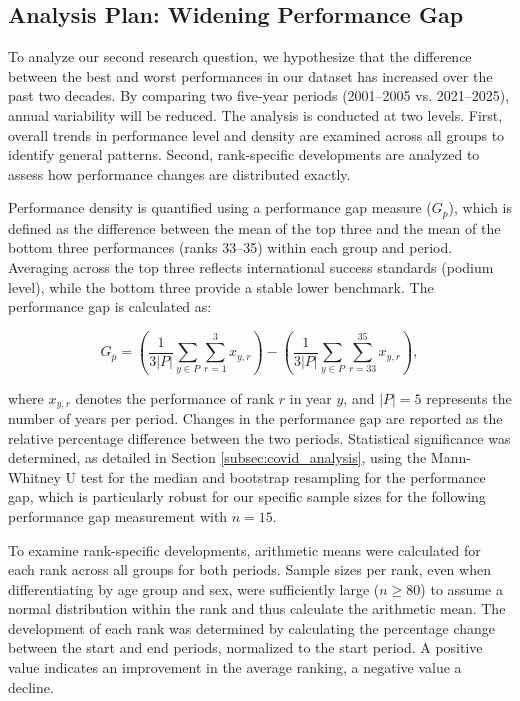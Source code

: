 \subsection{Analysis Plan: Widening Performance Gap}
To analyze our second research question, we hypothesize that the difference between the best and worst performances in our dataset has increased over the past two decades. By comparing two five-year periods (2001–2005 vs. 2021–2025), annual variability will be reduced. The analysis is conducted at two levels. First, overall trends in performance level and density are examined across all groups to identify general patterns. Second, rank-specific developments are analyzed to assess how performance changes are distributed exactly.

Performance density is quantified using a performance gap measure ($G_p$), which is defined as the difference between the mean of the top three and the mean of the bottom three performances (ranks 33–35) within each group and period. Averaging across the top three reflects international success standards (podium level), while the bottom three provide a stable lower benchmark. The performance gap is calculated as:

\begin{equation}
G_p = \left( \frac{1}{3|P|} \sum_{y \in P} \sum_{r=1}^{3} x_{y,r} \right) - \left( \frac{1}{3|P|} \sum_{y \in P} \sum_{r=33}^{35} x_{y,r} \right),
\end{equation}

where $x_{y,r}$ denotes the performance of rank $r$ in year $y$, and $|P| = 5$ represents the number of years per period. Changes in the performance gap are reported as the relative percentage difference between the two periods. Statistical significance was determined, as detailed in Section \ref{subsec:covid_analysis}, using the Mann-Whitney U test for the median and bootstrap resampling for the performance gap, which is particularly robust for our specific sample sizes for the following performance gap measurement with $n = 15$.

To examine rank-specific developments, arithmetic means were calculated for each rank across all groups for both periods. Sample sizes per rank, even when differentiating by age group and sex, were sufficiently large ($n \geq 80$) to assume a normal distribution within the rank and thus calculate the arithmetic mean. The development of each rank was determined by calculating the percentage change between the start and end periods, normalized to the start period. A positive value indicates an improvement in the average ranking, a negative value a decline.

